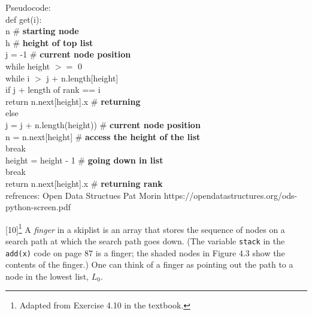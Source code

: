 \documentclass[addpoints]{exam}
\begin{document}
\begin{questions}
\begin{solution}
      Pseudocode:\\
  \indent \hspace{3em} def get(i): \\ 
  \indent \hspace{3em} n {\#} \textbf{starting node} \\
  \indent \hspace{3em} h {\#} \textbf{height of top list}\\
  \indent \hspace{3em} j = -1 {\#} \textbf{current node position}\\
  \indent \hspace{3em} while height $>=$ 0\\
  \indent \hspace{6em}while i $>$ j + n.length[height]\\
  \indent \hspace{9em}if j + length of rank == i\\
  \indent \hspace{12em}return n.next[height].x {\#} \textbf{returning}\\
  \indent \hspace{9em}else\\
  \indent \hspace{12em}j = j + n.length(height)) {\#} \textbf{current node position}\\
  \indent \hspace{12em}n = n.next[height] {\#} \textbf{access the height of the list}\\
  \indent \hspace{9em}break\\
  \indent \hspace{6em}height = height - 1 {\#} \textbf{going down in list}\\
  \indent \hspace{3em}break\\
  \indent \hspace{3em} return n.next[height].x {\#} \textbf{returning rank}\\
  

  
  refrences: Open Data Structues Pat Morin
  https://opendatastructures.org/ods-python-screen.pdf
    \end{solution}

[10]\footnote{Adapted from Exercise 4.10 in the textbook.}
  A \textit{finger} in a skiplist is an array that stores the sequence of nodes on a search path at which the search path goes down. (The variable \texttt{stack} in the \texttt{add(x)} code on page 87 is a finger; the shaded nodes in Figure 4.3 show the contents of the finger.) One can think of a finger as pointing out the path to a node in the lowest list, $L_0$.
  

\end{questions}
\end{document}
